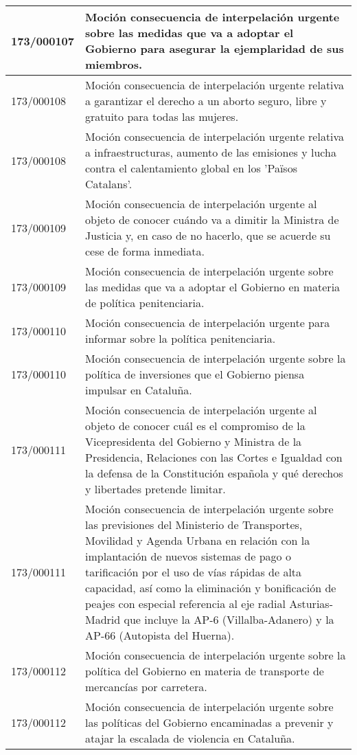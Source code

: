 {\begin{table}[H]
\begin{center}
\begin{tabularx}{\linewidth}{| l | X |}
\hline
173/000107 & Moción consecuencia de interpelación urgente sobre las medidas que va a adoptar el Gobierno para asegurar la ejemplaridad de sus miembros. \\
\hline
173/000108 & Moción consecuencia de interpelación urgente relativa a garantizar el derecho a un aborto seguro, libre y gratuito para todas las mujeres. \\
\hline
173/000108 & Moción consecuencia de interpelación urgente relativa a infraestructuras, aumento de las emisiones y lucha contra el calentamiento global en los 'Països Catalans'. \\
\hline
173/000109 & Moción consecuencia de interpelación urgente al objeto de conocer cuándo va a dimitir la Ministra de Justicia y, en caso de no hacerlo, que se acuerde su cese de forma inmediata. \\
\hline
173/000109 & Moción consecuencia de interpelación urgente sobre las medidas que va a adoptar el Gobierno en materia de política penitenciaria. \\
\hline
173/000110 & Moción consecuencia de interpelación urgente para informar sobre la política penitenciaria. \\
\hline
173/000110 & Moción consecuencia de interpelación urgente sobre la política de inversiones que el Gobierno piensa impulsar en Cataluña. \\
\hline
173/000111 & Moción consecuencia de interpelación urgente al objeto de conocer cuál es el compromiso de la Vicepresidenta del Gobierno y Ministra de la Presidencia, Relaciones con las Cortes e Igualdad con la defensa de la Constitución española y qué derechos y libertades pretende limitar. \\
\hline
173/000111 & Moción consecuencia de interpelación urgente sobre las previsiones del Ministerio de Transportes, Movilidad y Agenda Urbana en relación con la implantación de nuevos sistemas de pago o tarificación por el uso de vías rápidas de alta capacidad, así como la eliminación y bonificación de peajes con especial referencia al eje radial Asturias-Madrid que incluye la AP-6 (Villalba-Adanero) y la AP-66 (Autopista del Huerna). \\
\hline
173/000112 & Moción consecuencia de interpelación urgente sobre la política del Gobierno en materia de transporte de mercancías por carretera. \\
\hline
173/000112 & Moción consecuencia de interpelación urgente sobre las políticas del Gobierno encaminadas a prevenir y atajar la escalada de violencia en Cataluña. \\

\end{tabularx}
\end{center}
\end{table}}
